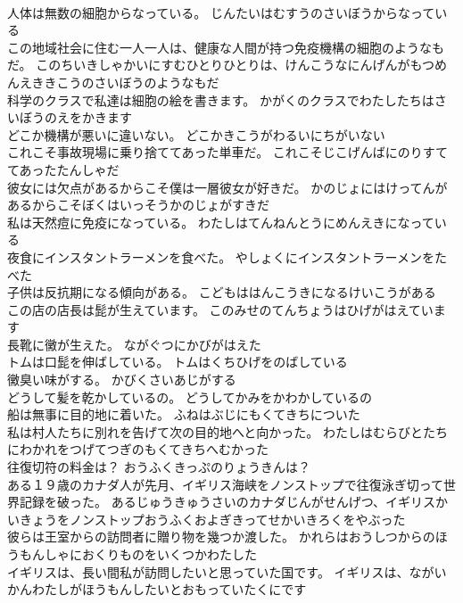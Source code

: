 \documentclass[8pt]{extreport}
\begin{document}
\begin{CJK}{UTF8}{min}
\\	人体は無数の細胞からなっている。	じんたいはむすうのさいぼうからなっている 
\\	この地域社会に住む一人一人は、健康な人間が持つ免疫機構の細胞のようなもだ。	このちいきしゃかいにすむひとりひとりは、けんこうなにんげんがもつめんえききこうのさいぼうのようなもだ 
\\	科学のクラスで私達は細胞の絵を書きます。	かがくのクラスでわたしたちはさいぼうのえをかきます 
\\	どこか機構が悪いに違いない。	どこかきこうがわるいにちがいない 
\\	これこそ事故現場に乗り捨ててあった単車だ。	これこそじこげんばにのりすててあったたんしゃだ 
\\	彼女には欠点があるからこそ僕は一層彼女が好きだ。	かのじょにはけってんがあるからこそぼくはいっそうかのじょがすきだ 
\\	私は天然痘に免疫になっている。	わたしはてんねんとうにめんえきになっている 
\\	夜食にインスタントラーメンを食べた。	やしょくにインスタントラーメンをたべた 
\\	子供は反抗期になる傾向がある。	こどもははんこうきになるけいこうがある 
\\	この店の店長は髭が生えています。	このみせのてんちょうはひげがはえています 
\\	長靴に黴が生えた。	ながぐつにかびがはえた 
\\	トムは口髭を伸ばしている。	トムはくちひげをのばしている 
\\	黴臭い味がする。	かびくさいあじがする 
\\	どうして髪を乾かしているの。	どうしてかみをかわかしているの 
\\	船は無事に目的地に着いた。	ふねはぶじにもくてきちについた 
\\	私は村人たちに別れを告げて次の目的地へと向かった。	わたしはむらびとたちにわかれをつげてつぎのもくてきちへむかった 
\\	往復切符の料金は？	おうふくきっぷのりょうきんは？ 
\\	ある１９歳のカナダ人が先月、イギリス海峡をノンストップで往復泳ぎ切って世界記録を破った。	あるじゅうきゅうさいのカナダじんがせんげつ、イギリスかいきょうをノンストップおうふくおよぎきってせかいきろくをやぶった 
\\	彼らは王室からの訪問者に贈り物を幾つか渡した。	かれらはおうしつからのほうもんしゃにおくりものをいくつかわたした 
\\	イギリスは、長い間私が訪問したいと思っていた国です。	イギリスは、ながいかんわたしがほうもんしたいとおもっていたくにです 

\end{CJK}
\end{document}
